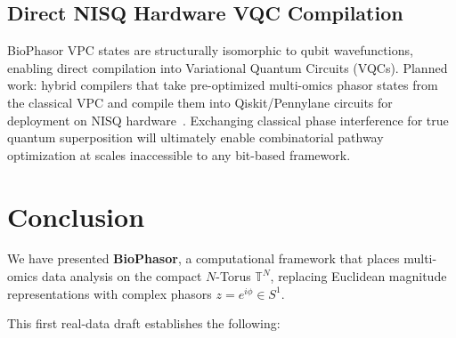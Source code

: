 \documentclass[preprint,12pt,amsmath,amssymb,superscriptaddress,floatfix]{revtex4-2}
\newcommand{\torus}{\mathbb{T}}
\begin{document}
\subsection{Direct NISQ Hardware VQC Compilation}
\label{subsec:nisq}

BioPhasor VPC states are structurally isomorphic to qubit wavefunctions,
enabling direct compilation into Variational Quantum Circuits (VQCs).
Planned work: hybrid compilers that take pre-optimized multi-omics phasor
states from the classical VPC and compile them into Qiskit/Pennylane
circuits for deployment on NISQ
hardware~\cite{ref_180,ref_181}.
Exchanging classical phase interference for true quantum superposition will
ultimately enable combinatorial pathway optimization at scales inaccessible
to any bit-based framework.

\section{Conclusion}

We have presented \textbf{BioPhasor}, a computational framework
that places multi-omics data analysis on the compact $N$-Torus $\torus^N$,
replacing Euclidean magnitude representations with complex phasors
$z = e^{i\phi} \in S^1$.

This first real-data draft establishes the following:
\end{document}
